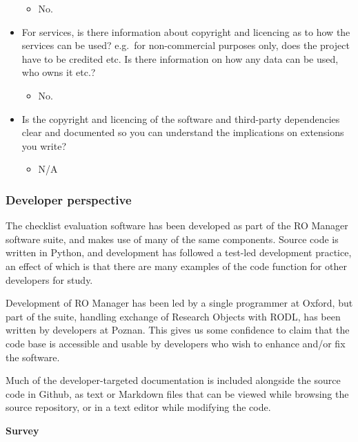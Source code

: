 \begin{itemize}
  \begin{itemize}
  \itemsep1pt\parskip0pt
  \item
    No.
  \end{itemize}
\item
  For services, is there information about copyright and licencing as to
  how the services can be used? e.g.~for non-commercial purposes only,
  does the project have to be credited etc. Is there information on how
  any data can be used, who owns it etc.?

  \begin{itemize}
  \itemsep1pt\parskip0pt
  \item
    No.
  \end{itemize}
\item
  Is the copyright and licencing of the software and third-party
  dependencies clear and documented so you can understand the
  implications on extensions you write?

  \begin{itemize}
  \itemsep1pt\parskip0pt
  \item
    N/A
  \end{itemize}
\end{itemize}

\subsubsection{Developer perspective}

The checklist evaluation software has been developed as part of the RO
Manager software suite, and makes use of many of the same components.
Source code is written in Python, and development has followed a
test-led development practice, an effect of which is that there are many
examples of the code function for other developers for study.

Development of RO Manager has been led by a single programmer at Oxford,
but part of the suite, handling exchange of Research Objects with RODL,
has been written by developers at Poznan. This gives us some confidence
to claim that the code base is accessible and usable by developers who
wish to enhance and/or fix the software.

Much of the developer-targeted documentation is included alongside the
source code in Github, as text or Markdown files that can be viewed
while browsing the source repository, or in a text editor while
modifying the code.

\textbf{Survey}

